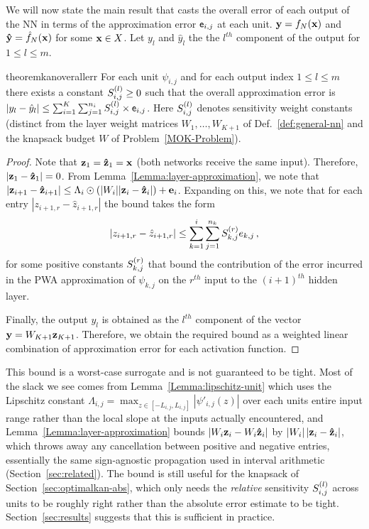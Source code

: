 We will now state the main result that casts the overall error of each output of the NN in terms of the approximation error $\mathsf{e}_{i,j}$ at each unit.   $ \mathbf{y} = f_N(\mathbf{x})$ and  $\mathbf{\hat{y}} = \hat{f}_N(\mathbf{x})$ for some $\mathbf{x} \in X$. Let $y_l$ and $\hat{y}_l$ the the $l^{th}$ component of the output for $1 \leq l \leq m$.

\begin{restatable}{theorem}{kanoverallerr}
\label{thm:kan-overall-error}
       For each  unit $\psi_{i,j}$ and for each output index $1 \leq l \leq m$ there exists a constant $S^{(l)}_{i,j} \geq 0$ such that the overall approximation error is
       $ | y_l - \hat{y}_l | \leq  \sum_{i=1}^K \sum_{j=1}^{n_{i}}  S^{(l)}_{i,j} \times \mathsf{e}_{i,j}$.
       Here $S^{(l)}_{i,j}$ denotes sensitivity weight constants (distinct from the layer weight matrices $W_1,\ldots,W_{K+1}$ of Def.~\ref{def:general-nn} and the knapsack budget $W$ of Problem~\ref{MOK-Problem}).
\end{restatable}
\begin{proof}
Note that $\mathbf{z}_1 = \mathbf{\hat{z}}_1 = \mathbf{x}$ (both networks receive the same input). Therefore, $|\mathbf{z}_1 - \mathbf{\hat{z}}_1| = 0$. From Lemma~\ref{Lemma:layer-approximation}, we note that $|\mathbf{z}_{i+1} - \mathbf{\hat{z}}_{i+1}| \leq \Lambda_i \odot (|W_i| | \mathbf{z}_i - \mathbf{\hat{z}}_i|) + \mathbf{e}_i$. Expanding on this, we note that for each entry $|z_{i+1, r} - \hat{z}_{i+1,r}|$ the bound takes the form
\[ |z_{i+1, r} - \hat{z}_{i+1,r}| \leq \sum_{k=1}^i \sum_{j=1}^{n_k} S^{(r)}_{k,j} e_{k,j} \,,\]
for some positive constants $S^{(r)}_{k,j}$ that bound the contribution of the error incurred in the PWA approximation of $\psi_{k,j}$ on the $r^{th}$ input to the $(i+1)^{th}$ hidden layer.

Finally, the output $y_l$ is obtained as the $l^{th}$ component of the vector $\mathbf{y} = W_{K+1} \mathbf{z}_{K+1}$. Therefore, we obtain the required bound as a weighted linear combination of approximation error for each activation function.
\end{proof}

This bound is a worst-case surrogate and is not guaranteed to be tight. Most of the slack we see comes from Lemma~\ref{Lemma:lipschitz-unit} which uses the Lipschitz constant $\Lambda_{i,j} = \max_{z \in [-L_{i,j}, L_{i,j}]} |\psi'_{i,j}(z)|$ over each units entire input range rather than the local slope at the inputs actually encountered, and Lemma~\ref{Lemma:layer-approximation} bounds $|W_i \mathbf{z}_i - W_i \mathbf{\hat{z}}_i|$ by $|W_i|\,|\mathbf{z}_i - \mathbf{\hat{z}}_i|$, which throws away any cancellation between positive and negative entries, essentially the same sign-agnostic propagation used in interval arithmetic (Section~\ref{sec:related}). The bound is still useful for the knapsack of Section~\ref{sec:optimalkan-abs}, which only needs the \emph{relative} sensitivity $S^{(l)}_{i,j}$ across units to be roughly right rather than the absolute error estimate to be tight. Section~\ref{sec:results} suggests that this is sufficient in practice.


